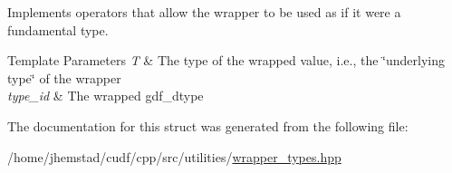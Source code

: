Implements operators that allow the wrapper to be used as if it were a fundamental type.


\begin{DoxyTemplParams}{Template Parameters}
{\em T} & The type of the wrapped value, i.\+e., the \char`\"{}underlying type\char`\"{} of the wrapper \\
\hline
{\em type\+\_\+id} & The wrapped gdf\+\_\+dtype \\
\hline
\end{DoxyTemplParams}


The documentation for this struct was generated from the following file\+:\begin{DoxyCompactItemize}
\item 
/home/jhemstad/cudf/cpp/src/utilities/\hyperlink{wrapper__types_8hpp}{wrapper\+\_\+types.\+hpp}\end{DoxyCompactItemize}
